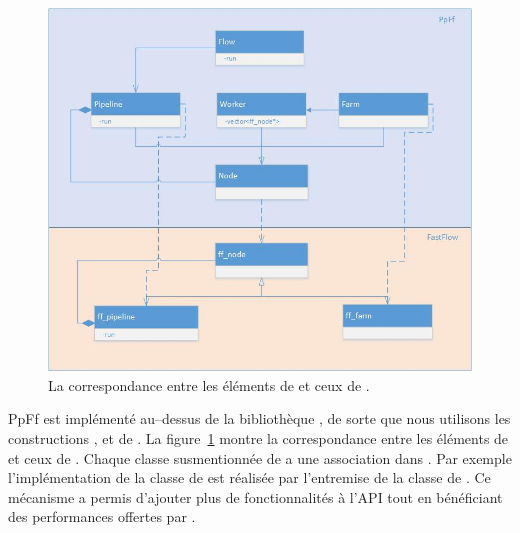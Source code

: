

\begin{figure}[ht]
\centering
     \includegraphics[width=1.0\textwidth]{Figures/CorrespondencePpFfToFastFlow.jpg}
      \caption{La correspondance entre les \'el\'ements de  et ceux de  .}
       \label{CorrespondencePpFfToFastFlow.fig}
\end{figure}




PpFf est impl\'ement\'e au--dessus de la biblioth\`eque , de sorte que nous utilisons les constructions ,  et  de . La figure~\ref{CorrespondencePpFfToFastFlow.fig} montre la correspondance entre les \'el\'ements de  et ceux de . Chaque classe susmentionn\'ee de  a une association dans . Par exemple l'impl\'ementation de la classe  de  est r\'ealis\'ee par l'entremise de la classe  de . Ce m\'ecanisme a permis d'ajouter plus de fonctionnalit\'es \`a l'API tout en b\'en\'eficiant des performances offertes par .


